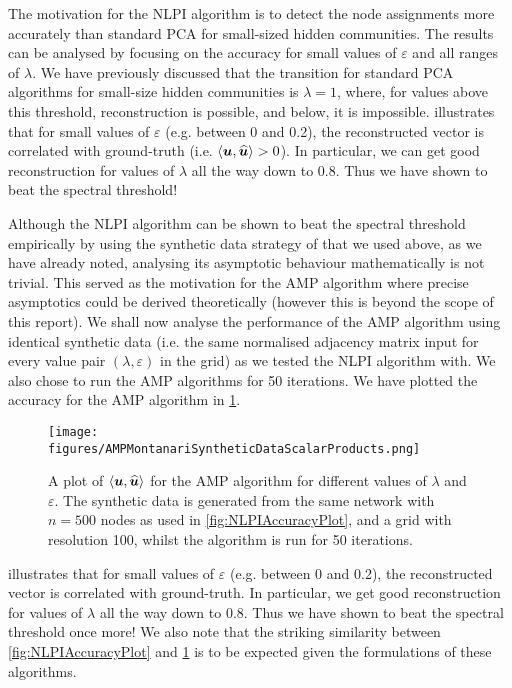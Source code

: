 The motivation for the NLPI algorithm is to detect the node assignments more accurately than standard PCA for small-sized hidden communities. The results can be analysed by focusing on the accuracy for small values of $\varepsilon$ and all ranges of $\lambda$.
We have previously discussed that the transition for standard PCA algorithms for small-size hidden communities is $\lambda = 1$, where, for values above this threshold, reconstruction is possible, and below, it is impossible.
 illustrates that for small values of $\varepsilon$ (e.g. between 0 and 0.2), the reconstructed vector is correlated with ground-truth (i.e. $\innerP{\vecvar{u},\widehat{\vecvar{u}}} > 0$).
In particular, we can get good reconstruction for values of $\lambda$ all the way down to 0.8. Thus we have shown to beat the spectral threshold!

Although the NLPI algorithm can be shown to beat the spectral threshold empirically by using the synthetic data strategy of \cite{Mon13}  that we used above, as we have already noted, analysing its asymptotic behaviour mathematically is not trivial.
This served as the motivation for the AMP algorithm where precise asymptotics could be derived theoretically (however this is beyond the scope of this report).
We shall now analyse the performance of the AMP algorithm using identical synthetic data (i.e. the same normalised adjacency matrix input for every value pair $(\lambda,\varepsilon)$ in the grid) as we tested the NLPI algorithm with. We also chose to run the AMP algorithms for 50 iterations.
We have plotted the accuracy for the AMP algorithm in \cref{fig:AMPAccuracyPlot}.


\begin{figure}
	\centering
	\texttt{[image: figures/AMPMontanariSyntheticDataScalarProducts.png]}
	\caption[Plot of accuracy for AMP algorithm]{\label{fig:AMPAccuracyPlot} A plot of $\innerP{\vecvar{u},\widehat{\vecvar{u}}}$ for the AMP algorithm for different values of $\lambda$ and $\varepsilon$. The synthetic data is generated from the same network with $n=500$ nodes as used in \cref{fig:NLPIAccuracyPlot}, and a grid with resolution 100, whilst the algorithm is run for 50 iterations.}
\end{figure}

 illustrates that for small values of $\varepsilon$ (e.g. between 0 and 0.2), the reconstructed vector is correlated with ground-truth.
In particular, we get good reconstruction for values of $\lambda$ all the way down to 0.8. Thus we have shown to beat the spectral threshold once more!
We also note that the striking similarity between \cref{fig:NLPIAccuracyPlot} and \cref{fig:AMPAccuracyPlot} is to be expected given the formulations of these algorithms.

